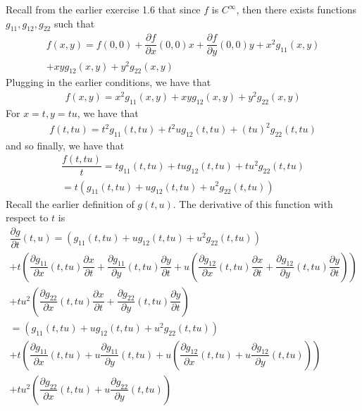 \documentclass{article}
\begin{document}
	Recall from the earlier exercise 1.6 that since $f$ is $C^{\infty}$, then there exists functions $g_{11}, g_{12}, g_{22}$ such that
	\begin{gather*}
		f(x, y) = f(0, 0) + \dfrac{\partial f}{\partial x}(0, 0)x + \dfrac{\partial f}{\partial y}(0, 0)y + x^2 g_{11}(x, y) \\
		+ xy g_{12}(x, y) + y^2 g_{22}(x, y)
	\end{gather*}
	Plugging in the earlier conditions, we have that
	\begin{gather*}
		f(x, y) = x^2 g_{11}(x, y) + xy g_{12}(x, y) + y^2 g_{22}(x, y)
	\end{gather*}
	For $x = t, y = tu$, we have that
	\begin{gather*}
		f(t, tu) = t^2 g_{11}(t, tu) + t^2u g_{12}(t, tu) + (tu)^2 g_{22}(t, tu)
	\end{gather*}	
	and so finally, we have that
	\begin{gather*}
		\dfrac{f(t, tu)}{t} = t g_{11}(t, tu) + tu g_{12}(t, tu) + tu^2 g_{22}(t, tu) \\
		= t \left( g_{11}(t, tu) + u g_{12}(t, tu) + u^2 g_{22}(t, tu) \right)
	\end{gather*}
	Recall the earlier definition of $g(t, u)$. The derivative of this function with respect to $t$ is
	\begin{gather*}
		\dfrac{\partial g}{\partial t}(t, u) = \left( g_{11}(t, tu) + u g_{12}(t, tu) + u^2 g_{22}(t, tu) \right) \\
		+ t \left(
		\dfrac{\partial g_{11}}{\partial x} (t, tu) \dfrac{\partial x}{\partial t} + \dfrac{\partial g_{11}}{\partial y} (t, tu) \dfrac{\partial y}{\partial t}
		+ u \left( \dfrac{\partial g_{12}}{\partial x} (t, tu) \dfrac{\partial x}{\partial t} + \dfrac{\partial g_{12}}{\partial y} (t, tu) \dfrac{\partial y}{\partial t} \right) \right) \\
		+ t u^2 \left( \dfrac{\partial g_{22}}{\partial x} (t, tu) \dfrac{\partial x}{\partial t} + \dfrac{\partial g_{22}}{\partial y} (t, tu) \dfrac{\partial y}{\partial t} \right) \\
		= \left( g_{11}(t, tu) + u g_{12}(t, tu) + u^2 g_{22}(t, tu) \right) \\
		+ t \left(
		\dfrac{\partial g_{11}}{\partial x} (t, tu) + u \dfrac{\partial g_{11}}{\partial y} (t, tu)
		+ u \left( \dfrac{\partial g_{12}}{\partial x} (t, tu) + u \dfrac{\partial g_{12}}{\partial y} (t, tu) \right) \right) \\
		+ tu^2 \left( \dfrac{\partial g_{22}}{\partial x} (t, tu) + u \dfrac{\partial g_{22}}{\partial y} (t, tu) \right)
	\end{gather*}
\end{document}
